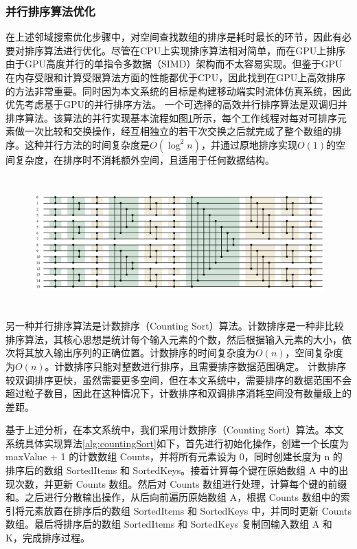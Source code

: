 \subsubsection{并行排序算法优化}
在上述邻域搜索优化步骤中，对空间查找数组的排序是耗时最长的环节，因此有必要对排序算法进行优化。尽管在CPU上实现排序算法相对简单，而在GPU上排序由于GPU高度并行的单指令多数据（SIMD）架构而不太容易实现。但鉴于GPU在内存受限和计算受限算法方面的性能都优于CPU，因此找到在GPU上高效排序的方法非常重要。同时因为本文系统的目标是构建移动端实时流体仿真系统，因此优先考虑基于GPU的并行排序方法。
一个可选择的高效并行排序算法是双调归并排序算法。该算法的并行实现基本流程如图\ref{fig:bitonic}所示，每个工作线程对每对可排序元素做一次比较和交换操作，经互相独立的若干次交换之后就完成了整个数组的排序。这种并行方法的时间复杂度是$O(\log^2 n)$，并通过原地排序实现$O(1)$的空间复杂度，在排序时不消耗额外空间，且适用于任何数据结构。


\begin{figure}[ht]
    \centering
    \includegraphics[height=5cm]{image/bitonicSort.png}
    \label{fig:bitonic}
   \end{figure}

另一种并行排序算法是计数排序（Counting Sort）算法。计数排序是一种非比较排序算法，其核心思想是统计每个输入元素的个数，然后根据输入元素的大小，依次将其放入输出序列的正确位置。计数排序的时间复杂度为$O(n)$，空间复杂度为$O(n)$。计数排序只能对整数进行排序，且需要排序数据范围确定。
计数排序较双调排序更快，虽然需要更多空间，但在本文系统中，需要排序的数据范围不会超过粒子数目，因此在这种情况下，计数排序和双调排序消耗空间没有数量级上的差距。

基于上述分析，在本文系统中，我们采用计数排序（Counting Sort）算法。本文系统具体实现算法\ref{alg:countingSort}如下，首先进行初始化操作，创建一个长度为 maxValue + 1 的计数数组 Counts，并将所有元素设为 0，同时创建长度为 n 的排序后的数组 SortedItems 和 SortedKeys。接着计算每个键在原始数组 A 中的出现次数，并更新 Counts 数组。然后对 Counts 数组进行处理，计算每个键的前缀和。之后进行分散输出操作，从后向前遍历原始数组 A，根据 Counts 数组中的索引将元素放置在排序后的数组 SortedItems 和 SortedKeys 中，并同时更新 Counts 数组。最后将排序后的数组 SortedItems 和 SortedKeys 复制回输入数组 A 和 K，完成排序过程。

